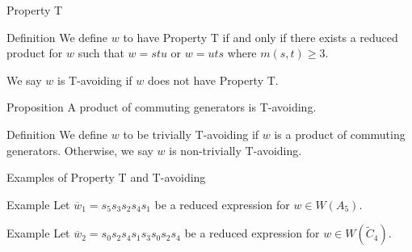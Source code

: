 \documentclass[9pt,handout]{beamer}
\newcommand{\w}{\overline{w}}
\newcommand{\C}{\widetilde{C}}
\newcommand\heapblock[4]{\fill[fill=#4, fill opacity=0.35, draw=#4, line width=1.1pt, rounded corners,shift={(\xxaxis:#1)},shift={(\yyaxis:#2)}] (-1,-1) rectangle (1,1);\node at (#1,#2) {\footnotesize $#3$};}
\newcommand\xxaxis{0}
\newcommand\yyaxis{90}
\begin{document}
\begin{frame}{Property T}
	\begin{block}{Definition}
	We define $w$ to have \alert{Property T} if and only if there exists a reduced product for $w$ such that $w=stu$ or $w=uts$ where $m(s,t) \geq 3$. \pause 
	
	We say $w$ is \alert{T-avoiding} if $w$ does not have Property T.
	\end{block}

\begin{block}{Proposition}
A product of commuting generators is T-avoiding.	
\end{block}

\begin{block}{Definition}
	We define $w$ to be \alert{trivially T-avoiding} if $w$ is a product of commuting generators. Otherwise, we say $w$ is \alert{non-trivially T-avoiding}.
\end{block}

\end{frame}




\begin{frame}{Examples of Property T and T-avoiding}

\begin{block}{Example}
Let $\w_1=s_5s_3s_2s_4s_1$ be a reduced expression for $w \in W(A_5)$. 
\pause
\begin{figure}
\end{figure}
\end{block}

\pause

\begin{block}{Example}
Let $\w_2=s_0s_2s_4s_1s_3s_0s_2s_4$ be a reduced expression for $w \in W(\C_4)$.
\begin{figure}
\end{figure}
\end{block}

\end{frame}
\end{document}
